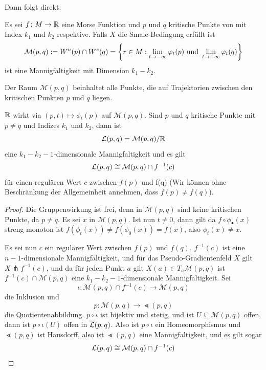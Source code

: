 Dann folgt direkt:

\begin{prop}
    Es sei $f \colon M \to { \mathbb R }$ eine Morse Funktion und $p$ und $q$ kritische Punkte von mit Index $k_1$
    und $k_2$ respektive. Falls $X$ die Smale-Bedingung erfüllt ist
    \[ \mathcal{M} (p, q) := { W^u } (p) \cap { W^s } (q) = 
        \left\{ r \in M : \lim_{t \to - \infty} \varphi_t(p) \text{ und } 
        \lim_{t \to + \infty} \varphi_t(q) \right\} \]
    ist eine Mannigfaltigkeit mit Dimension $k_1 - k_2$.
\end{prop}

Der Raum $\mathcal{M} (p, q)$ beinhaltet alle Punkte, die auf Trajektorien zwischen den kritischen
Punkten $p$ und $q$ liegen. 


\begin{prop}
    \label{prop: wohldefiniertheit von Lt}
    ${ \mathbb R }$ wirkt via $(p, t) \mapsto \phi_t(p)$ auf $\mathcal{M}(p, q)$. Sind $p$ und $q$ kritische 
    Punkte mit $p \neq q$ und Indizes $k_1$ und $k_2$, dann ist 
    \[ { \mathcal{L} } (p, q) = \mathcal{M} (p, q) / { \mathbb R } \]
    eine $k_1 - k_2 - 1$-dimensionale Mannigfaltigkeit und es gilt 
    \[ { \mathcal{L} } (p, q) \cong \mathcal{M} (p, q) \cap f^{-1}(c) \]
    für einen regulären Wert $c$ zwischen $f(p)$ und f(q)
    (Wir können ohne Beschränkung der Allgemeinheit annehmen, dass $f(p) \neq f(q)$).
\end{prop}

\begin{proof}
    Die Gruppenwirkung ist frei, denn in $\mathcal{M} (p, q)$
    sind keine kritischen Punkte, da $p \neq q$. Es sei $x$ in $\mathcal{M} (p, q)$. 
    Ist nun $t \neq 0$, dann gilt da $f \circ \phi_{\bullet}(x)$ streng monoton ist 
    $f(\phi_t(x)) \neq f(\phi_0(x)) = f(x)$, also $\phi_t(x) \neq x$.

    Es sei nun $c$ ein regulärer Wert zwischen $f(p)$ und $f(q)$. $f^{-1}(c)$ ist eine 
    $n - 1$-dimensionale Mannigfaltigkeit, und für das Pseudo-Gradientenfeld $X$ gilt 
    $X \pitchfork f^{-1}(c)$, und da für jeden Punkt $a$ gilt $X(a) \in T_a \mathcal{M} (p, q)$
    ist $f^{-1}(c) \cap \mathcal{M} (p, q)$ eine $k_1 - k_2 - 1$-dimensionale Mannigfaltigkeit.
    Sei 
    \[ \iota \colon \mathcal{M} (p, q) \cap f^{-1}(c) \to \mathcal{M}(p, q)\] 
    die Inklusion und 
    \[ p \colon \mathcal{M} (p, q) \to \Lt (p, q) \] 
    die Quotientenabbildung. $p \circ \iota$ ist bijektiv und stetig, und ist 
    $U \subseteq \mathcal{M} (p, q)$ offen, dann ist $p \circ \iota (U)$ offen in ${\overline{\mathcal{L}} } (p, q)$. 
    Also ist $p \circ \iota$ ein Homeomorphismus und $\Lt (p, q)$ ist Hausdorff, also ist $\Lt (p, q)$
    eine Mannigfaltigkeit, und es gilt sogar
    \[ { \mathcal{L} } (p, q) \cong \mathcal{M} (p, q) \cap f^{-1}(c) \]
\end{proof}

